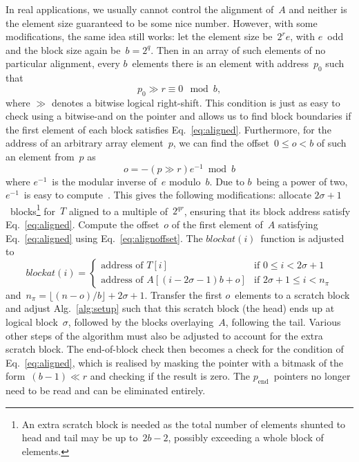 \documentclass[nolineno,a4paper,UKenglish,cleveref, autoref, thm-restate]{socg-lipics-v2021}
\def\blockat{\textit{blockat}}
\begin{document}
In real applications, we usually cannot control the alignment of~$A$
and neither is the element size guaranteed to be some nice number.
However, with some modifications, the same idea
still works: let the element size be~$2^r e$, with $e$~odd and the
block size again be~$b=2^q$.  Then in an array of such elements of
no particular alignment, every $b$~elements there is an element with
address~$p_0$ such that
\begin{equation}
p_0\gg r\equiv 0\mod b, \label{eq:aligned}
\end{equation}
where $\gg$ denotes a bitwise logical right-shift.
This condition is just as easy to check using a bitwise-and on the
pointer and allows us to find block boundaries if the first element
of each block satisfies Eq.~\ref{eq:aligned}.
Furthermore, for the address of an arbitrary array element~$p$, we can find
the offset~$0\le o<b$ of such an element from~$p$ as
\begin{equation}
o=-(p\gg r)e^{-1}\bmod b \label{eq:alignoffset}
\end{equation}
where $e^{-1}$~is the modular inverse of~$e$ modulo~$b$.
Due to $b$~being a power of two, $e^{-1}$~is easy to compute~\cite{Hurchalla2022}.
This gives the following modifications: allocate
$2\sigma+1$~blocks\footnote{An extra scratch block is needed as the total number
of elements shunted to head and tail may be up to~$2b-2$, possibly exceeding a
whole block of elements.} for~$T$
aligned to a multiple of~$2^{qr}$, ensuring that its block address satisfy Eq.~\ref{eq:aligned}.
Compute the offset~$o$ of the first element of~$A$ satisfying Eq.~\ref{eq:aligned}
using Eq.~\ref{eq:alignoffset}.
The $\blockat(i)$~function is adjusted to
\begin{equation}
\blockat(i)=
\begin{cases}
\mbox{address of $T[i]$}&\mbox{if $0\le i<2\sigma+1$}\\
\mbox{address of $A[(i-2\sigma-1)b+o]$}&\mbox{if $2\sigma+1\le i<n_\pi$}
\end{cases}
\end{equation}
and~$n_\pi=\lfloor(n-o)/b\rfloor+2\sigma+1$.
Transfer the first $o$~elements to a scratch block and adjust Alg.~\ref{alg:setup}
such that this scratch block (the head) ends up at logical block~$\sigma$,
followed by the blocks overlaying~$A$, following the tail.
Various other steps of the algorithm must also be adjusted to account for the
extra scratch block.
The end-of-block check then becomes a check for the condition of Eq.~\ref{eq:aligned},
which is realised by masking the pointer with a bitmask of the form~$(b-1)\ll r$
and checking if the result is zero.  The $p_{\mathrm{end}}$~pointers no longer
need to be read and can be eliminated entirely.
\end{document}
